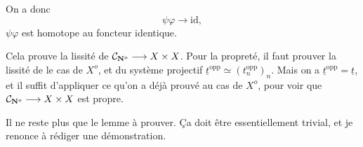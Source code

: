 On a donc
\[ \psi\varphi \longrightarrow \mathrm{id}, \]
$\psi\varphi$ est homotope au foncteur identique.

Cela prouve la lissité de $\mathcal{C}_{\mathbf{N}^o} \longrightarrow X \times X$. Pour la propreté, il faut prouver la lissité de le cas de $X^o$, et du système projectif $\underline{t}^{\mathrm{opp}} \simeq (t_n^{\mathrm{opp}})_n$. Mais on a $\underline{t}^{\mathrm{opp}} = \underline{t}$, et il suffit d'appliquer ce qu'on a déjà prouvé au cas de $X^o$, pour voir que $\mathcal{C}_{\mathbf{N}^o} \longrightarrow X \times X$ est propre. %

Il ne reste plus que le lemme à prouver. Ça doit être essentiellement
trivial, et je renonce à rédiger une démonstration.

